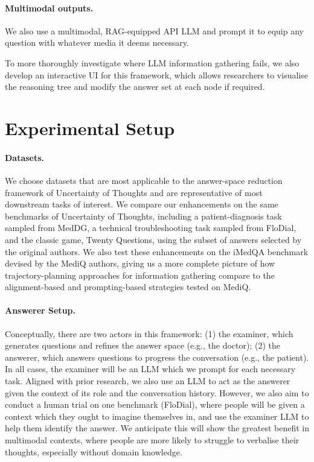 \documentclass{article} %
\begin{document}
\paragraph{Multimodal outputs.}
We also use a multimodal, RAG-equipped API LLM and prompt it to equip any question with whatever media it deems necessary.

To more thoroughly investigate where LLM information gathering fails, we also develop an interactive UI for this framework, which allows researchers to visualise the reasoning tree and modify the answer set at each node if required.

\section{Experimental Setup}

\paragraph{Datasets.}
We choose datasets that are most applicable to the answer-space reduction framework of Uncertainty of Thoughts and are representative of most downstream tasks of interest. We compare our enhancements on the same benchmarks of Uncertainty of Thoughts, including a patient-diagnosis task sampled from MedDG, a technical troubleshooting task sampled from FloDial, and the classic game, Twenty Questions, using the subset of answers selected by the original authors. We also test these enhancements on the iMedQA benchmark devised by the MediQ authors, giving us a more complete picture of how trajectory-planning approaches for information gathering compare to the alignment-based and prompting-based strategies tested on MediQ.

\paragraph{Answerer Setup.}
Conceptually, there are two actors in this framework: (1) the examiner, which generates questions and refines the answer space (e.g., the doctor); (2) the answerer, which answers questions to progress the conversation (e.g., the patient). In all cases, the examiner will be an LLM which we prompt for each necessary task. Aligned with prior research, we also use an LLM to act as the answerer given the context of its role and the conversation history. However, we also aim to conduct a human trial on one benchmark (FloDial), where people will be given a context which they ought to imagine themselves in, and use the examiner LLM to help them identify the answer. We anticipate this will show the greatest benefit in multimodal contexts, where people are more likely to struggle to verbalise their thoughts, especially without domain knowledge.
\end{document}
